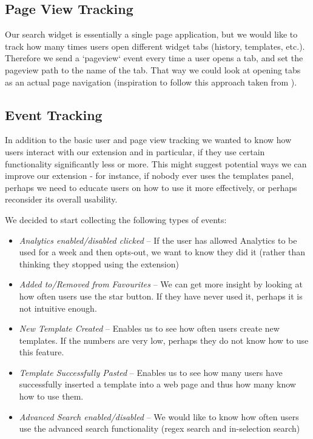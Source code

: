 \documentclass[bsc,frontabs,twoside,singlespacing,parskip,deptreport]{infthesis}
\providecommand{\tightlist}{%
  \setlength{\itemsep}{0pt}\setlength{\parskip}{0pt}}
\begin{document}
\subsection{Page View Tracking}
Our search widget is essentially a single page application, but we would like to track how many times users open different widget tabs (history, templates, etc.). Therefore we send a `pageview` event every time a user opens a tab, and set the pageview path to the name of the tab. That way we could look at opening tabs as an actual page navigation (inspiration to follow this approach taken from \cite{A22}).

\subsection{Event Tracking}
In addition to the basic user and page view tracking we wanted to know how users interact with our extension and in particular, if they use certain functionality significantly less or more. This might suggest potential ways we can improve our extension - for instance, if nobody ever uses the templates panel, perhaps we need to educate users on how to use it more effectively, or perhaps reconsider its overall usability.

We decided to start collecting the following types of events:
\begin{itemize}
\tightlist
\item
  \textit{Analytics enabled/disabled clicked} -- If the user has allowed Analytics to be used for a week and then opts-out, we want to know they did it (rather than thinking they stopped using the extension)
\item
  \textit{Added to/Removed from Favourites} -- We can get more insight by looking at how often users use the star button. If they have never used it, perhaps it is not intuitive enough.
\item
  \textit{New Template Created} -- Enables us to see how often users create new templates. If the numbers are very low, perhaps they do not know how to use this feature.
\item
  \textit{Template Successfully Pasted} -- Enables us to see how many users have successfully inserted a template into a web page and thus how many know how to use them.
\item
  \textit{Advanced Search enabled/disabled} -- We would like to know how often users use the advanced search functionality (regex search and in-selection search)
\end{itemize}
\end{document}
